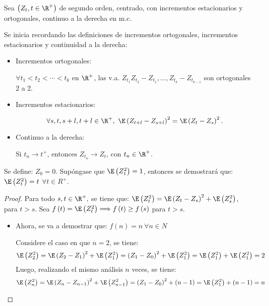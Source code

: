 \begin{ejemplo}
Sea $\left( Z_{t},t\in \R^{+} \right)$ de segundo orden, centrado, con incrementos estacionarios y ortogonales, continuo a la 
derecha en m.c. 

Se inicia recordando las definiciones de incrementos ortogonales, incrementos estacionarios y continuidad a la derecha:

\begin{itemize}
\item Incrementos ortogonales: 
\begin{center}
$\forall t_{1}<t_{2}<\cdots <t_{k}$ en $\R^{+}$, las v.a. $Z_{t_{1}}Z_{t_{2}}-Z_{t_{1}},\ldots,Z_{t_{k}}-Z_{t_{k-1}}$ 
son ortogonales 2 a 2.
\end{center}

\item Incrementos estacionarios: 

\[
\forall  s,t,s+l,t+l \in \R^{+},\ \E\left(Z_{t+l}-Z_{s+l} \right)^{2}=\E\left( Z_{t}-Z_{s} \right)^{2}.
\]

\item Continuo a la derecha: 
\begin{center}
Si $t_{n}\to t^{+}$, entonces $Z_{t_{n}}\to Z_{t}$, con $t_{n}\in\R^{+}$.
\end{center}
\end{itemize}

Se define: $Z_{0}=0$. Sup\'{o}ngase que $\E\left( Z_{1}^{2} \right)=1$, entonces se demostrar\'{a} que: $\E\left( Z_{t}^{2} \right)=t$ $\forall t\in R^{+}$.

\begin{proof} 
Para todo $s,t \in \R^{+},$ se tiene que: $\E\left( Z_{t}^{2} \right)=\E\left( Z_{t}-Z_{s} \right)^{2}+\E\left( Z_{s}^{2} \right)$, para $t>s$. Sea $f\left( t \right)=\E\left( Z_{t}^{2} \right)\Longrightarrow f\left( t \right)\geq f\left( s \right)$ para $t>s$.

\begin{itemize}
\item Ahora, se va a demostrar que: $f\left( n \right)=n\ \forall n\in N$

Considere el caso en que $n=2$, se tiene:
\[
\E\left( Z_{2}^{2} \right)=\E\left( Z_{2}-Z_{1} \right)^{2}+\E\left( Z_{1}^{2} 
\right)=\left( Z_{1}-Z_{0} \right)^{2}+\E\left( Z_{1}^{2} \right)=\E\left( 
Z_{1}^{2} \right)+\E\left( Z_{1}^{2} \right)=2
\]
Luego, realizando el mismo an\'{a}lisis $n$ veces, se tiene:
\[
\E\left( Z_{n}^{2} \right)=\E\left( Z_{n}-Z_{n-1} \right)^{2}+\E\left( 
Z_{n-1}^{2} \right)=\left( Z_{1}-Z_{0} \right)^{2}+\left( n-1 
\right)=\E\left( Z_{1}^{2} \right)+\left( n-1 \right)=n
\]


\end{itemize}
\end{proof}
\end{ejemplo}
